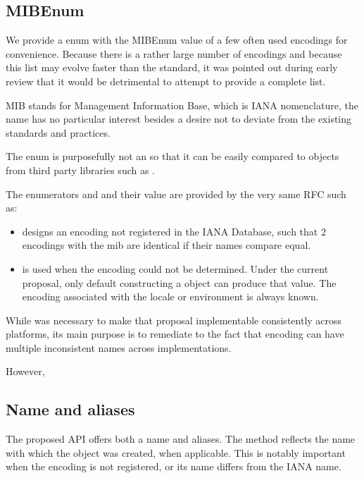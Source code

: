 \documentclass{wg21}
\begin{document}
\subsection{MIBEnum}

We provide a  enum with the MIBEnum value of a few often used encodings for convenience.
Because there is a rather large number of encodings and because this list may evolve faster than the standard, it was pointed out during early review that it would be detrimental to attempt to provide a complete list.
\begin{note}
MIB stands for Management Information Base, which is IANA nomenclature, the name has no particular interest besides a desire not to deviate from the existing standards and practices.
\end{note}

The enum is purposefully not an  so that it can be easily compared to objects from
third party libraries such as .

The enumerators  and  and their value are provided by the very same RFC such as:

\begin{itemize}
	\item {} designs an encoding not registered in the IANA Database, such that 2 encodings with the  mib are identical if their names compare equal.
	\item {} is used when the encoding could not be determined. Under the current proposal,  only default constructing a  object can produce that value. The encoding associated with the locale or environment is always known.
\end{itemize}

While  was necessary to make that proposal implementable consistently across platforms,
its main purpose is to remediate to the fact that encoding can have multiple inconsistent names across implementations.

However,

\subsection{Name and aliases}

The proposed API offers both a name and aliases.
The  method reflects the name with which the  object was created, when applicable.
This is notably important when the encoding is not registered, or its name differs from the IANA name.
\end{document}
